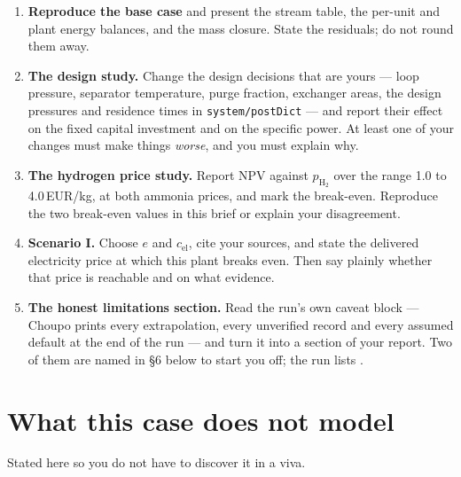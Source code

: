 \documentclass[11pt,a4paper]{article}
\begin{document}
\begin{enumerate}[leftmargin=*]
\item \textbf{Reproduce the base case} and present the stream table, the
      per-unit and plant energy balances, and the mass closure. State the
      residuals; do not round them away.
\item \textbf{The design study.} Change the design decisions that are yours ---
      loop pressure, separator temperature, purge fraction, exchanger areas,
      the design pressures and residence times in \texttt{system/postDict} ---
      and report their effect on the fixed capital investment and on the
      specific power. At least one of your changes must make things
      \emph{worse}, and you must explain why.
\item \textbf{The hydrogen price study.} Report NPV against $p_{\mathrm{H_2}}$
      over the range 1.0 to 4.0\,EUR/kg, at both ammonia prices, and mark the
      break-even. Reproduce the two break-even values in this brief or explain
      your disagreement.
\item \textbf{Scenario I.} Choose $e$ and $c_{\mathrm{el}}$, cite your sources,
      and state the delivered electricity price at which this plant breaks
      even. Then say plainly whether that price is reachable and on
      what evidence.
\item \textbf{The honest limitations section.} Read the run's own caveat block
      --- Choupo prints every extrapolation, every unverified record and every
      assumed default at the end of the run --- and turn it into a section of
      your report. Two of them are named in \S6 below to start you off; the run
      lists .
\end{enumerate}

\section{What this case does not model}

Stated here so you do not have to discover it in a viva.
\end{document}
